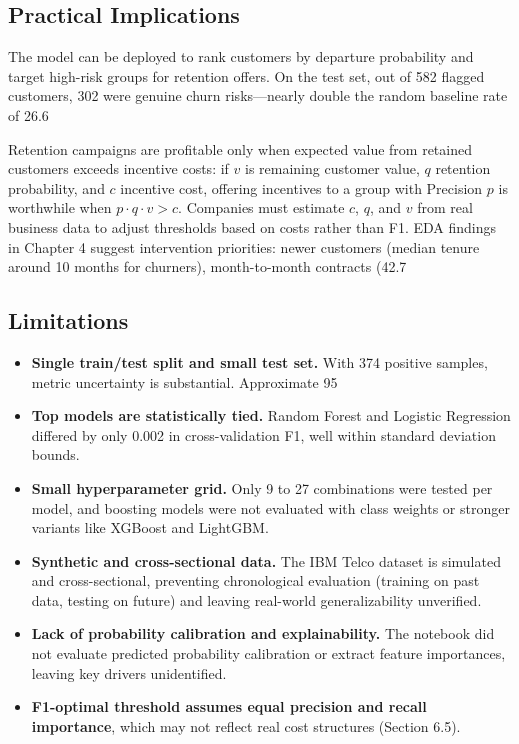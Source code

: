 \subsection{ Practical Implications}

The model can be deployed to rank customers by departure probability and target high-risk groups for retention offers. On the test set, out of 582 flagged customers, 302 were genuine churn risks—nearly double the random baseline rate of 26.6%

Retention campaigns are profitable only when expected value from retained customers exceeds incentive costs: if $v$ is remaining customer value, $q$ retention probability, and $c$ incentive cost, offering incentives to a group with Precision $p$ is worthwhile when $p \cdot q \cdot v > c$. Companies must estimate $c$, $q$, and $v$ from real business data to adjust thresholds based on costs rather than F1. EDA findings in Chapter 4 suggest intervention priorities: newer customers (median tenure around 10 months for churners), month-to-month contracts (42.7%

\subsection{ Limitations}

\begin{itemize}
    \item \textbf{Single train/test split and small test set.} With 374 positive samples, metric uncertainty is substantial. Approximate 95%
    \item \textbf{Top models are statistically tied.} Random Forest and Logistic Regression differed by only 0.002 in cross-validation F1, well within standard deviation bounds.
    \item \textbf{Small hyperparameter grid.} Only 9 to 27 combinations were tested per model, and boosting models were not evaluated with class weights or stronger variants like XGBoost and LightGBM.
    \item \textbf{Synthetic and cross-sectional data.} The IBM Telco dataset is simulated and cross-sectional, preventing chronological evaluation (training on past data, testing on future) and leaving real-world generalizability unverified.
    \item \textbf{Lack of probability calibration and explainability.} The notebook did not evaluate predicted probability calibration or extract feature importances, leaving key drivers unidentified.
    \item \textbf{F1-optimal threshold assumes equal precision and recall importance}, which may not reflect real cost structures (Section 6.5).
\end{itemize}

